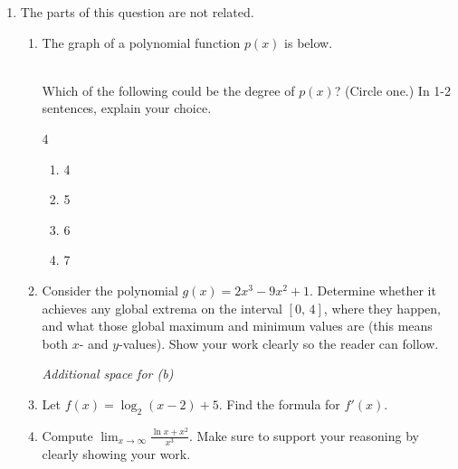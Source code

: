 \documentclass{article}
\begin{document}
\begin{enumerate}
\newpage 
 
 \emph{This space left blank for work on 2.}

 
     
    \newpage
     
    \newpage

  \item  The parts of this question are not related.
    \begin{enumerate}
        \item The graph of a polynomial function $p(x)$ is below. \\
        
          \\
        
        Which of the following could be the degree of $p(x)$? (Circle one.) In 1-2 sentences, explain your choice.
        \begin{multicols}{4}
        \begin{enumerate}
            \item 4
            \item 5
            \item 6
            \item 7
        \end{enumerate}
        
        \end{multicols}
        \vspace{0.75in}
        \item Consider the polynomial $g(x)=2x^3-9x^2+1$. Determine whether it achieves any global extrema on the interval $[0,\,4]$, where they happen, and what those global maximum and minimum values are (this means both $x$- and $y$-values). Show your work clearly so the reader can follow.
        
        \vfill
        \newpage
        \emph{Additional space for (b)}
        \vspace{2in}
        \
        \item Let $f(x)=\log_2(x-2)+5$. Find the formula for $f'(x)$.
        \vfill
        \item Compute $\displaystyle \lim_{x\to\infty}\frac{\ln x + x^2}{x^3}$. Make sure to support your reasoning by clearly showing your work.
        \vfill
    \end{enumerate}
   

\end{enumerate}
\end{document}
